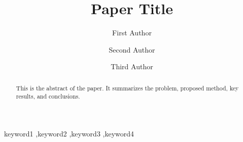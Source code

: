 \documentclass[preprint,12pt]{elsarticle}
\begin{document}
\begin{frontmatter}

\title{Paper Title }

\author[inst1]{First Author}

\author[inst2]{Second Author}

\author[inst1]{Third Author}

\address[inst1]{Department of Computer Science, University Name, City, Country}
\address[inst2]{Department of Engineering, Another University, City, Country}

\begin{abstract}
This is the abstract of the paper. It summarizes the problem, proposed method,
key results, and conclusions.
\end{abstract}

\begin{keyword}
keyword1 \sep keyword2 \sep keyword3 \sep keyword4
\end{keyword}

\end{frontmatter}










\end{document}
